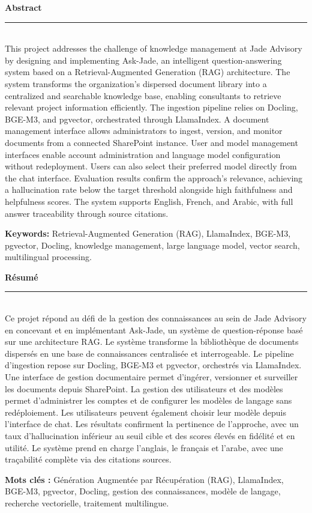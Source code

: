 \documentclass[12pt,a4paper]{report}
\begin{document}
\newcommand{\HRule}{\rule{\linewidth}{0.5mm}}

\textbf{Abstract} \\
\HRule \\
This project addresses the challenge of knowledge management at Jade Advisory by
designing and implementing Ask-Jade, an intelligent question-answering system based
on a Retrieval-Augmented Generation (RAG) architecture. The system transforms the
organization's dispersed document library into a centralized and searchable knowledge
base, enabling consultants to retrieve relevant project information efficiently. The
ingestion pipeline relies on Docling, BGE-M3, and pgvector, orchestrated through
LlamaIndex. A document management interface allows administrators to ingest, version,
and monitor documents from a connected SharePoint instance. User and model management
interfaces enable account administration and language model configuration without
redeployment. Users can also select their preferred model directly from the chat
interface. Evaluation results confirm the approach's relevance, achieving a
hallucination rate below the target threshold alongside high faithfulness and
helpfulness scores. The system supports English, French, and Arabic, with full
answer traceability through source citations.

\smallskip
\textbf{Keywords:} Retrieval-Augmented Generation (RAG), LlamaIndex, BGE-M3,
pgvector, Docling, knowledge management, large language model, vector search,
multilingual processing.

\vskip2cm

\textbf{Résumé} \\
\HRule \\
Ce projet répond au défi de la gestion des connaissances au sein de Jade Advisory en
concevant et en implémentant Ask-Jade, un système de question-réponse basé sur une
architecture RAG. Le système transforme la bibliothèque de documents dispersés en
une base de connaissances centralisée et interrogeable. Le pipeline d'ingestion repose
sur Docling, BGE-M3 et pgvector, orchestrés via LlamaIndex. Une interface de gestion
documentaire permet d'ingérer, versionner et surveiller les documents depuis SharePoint.
La gestion des utilisateurs et des modèles permet d'administrer les comptes et de
configurer les modèles de langage sans redéploiement. Les utilisateurs peuvent
également choisir leur modèle depuis l'interface de chat. Les résultats confirment
la pertinence de l'approche, avec un taux d'hallucination inférieur au seuil cible
et des scores élevés en fidélité et en utilité. Le système prend en charge l'anglais,
le français et l'arabe, avec une traçabilité complète via des citations sources.

\smallskip
\textbf{Mots clés :} Génération Augmentée par Récupération (RAG), LlamaIndex,
BGE-M3, pgvector, Docling, gestion des connaissances, modèle de langage,
recherche vectorielle, traitement multilingue.
\end{document}
